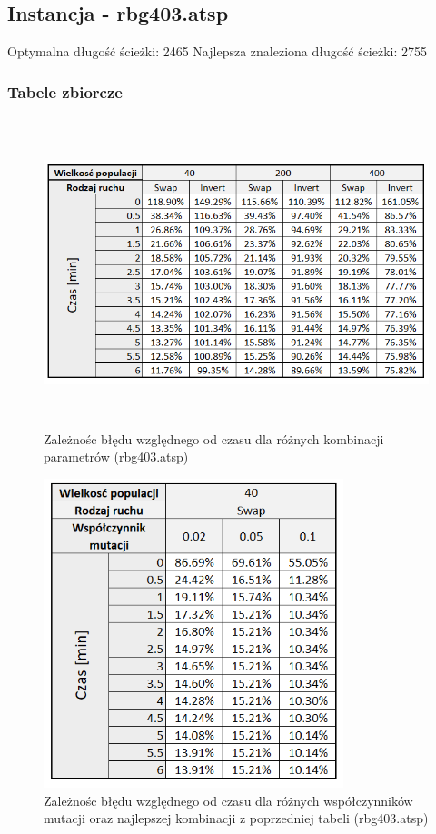 \documentclass[a4paper,11pt]{article}
\begin{document}
\newpage
\subsection{Instancja - rbg403.atsp}

Optymalna długość ścieżki: 2465
\newline Najlepsza znaleziona długość ścieżki: 2755

\subsubsection{Tabele zbiorcze}

\begin{figure}[H]
\centering
\includegraphics[height=9cm]{t2.PNG}
\caption{Zależnośc błędu względnego od czasu dla różnych kombinacji parametrów (rbg403.atsp)}
\end{figure}

\begin{figure}[H]
\centering
\includegraphics[height=9cm]{t5.PNG}
\caption{Zależnośc błędu względnego od czasu dla różnych współczynników mutacji oraz najlepszej kombinacji z poprzedniej tabeli (rbg403.atsp)}
\end{figure}
\end{document}
